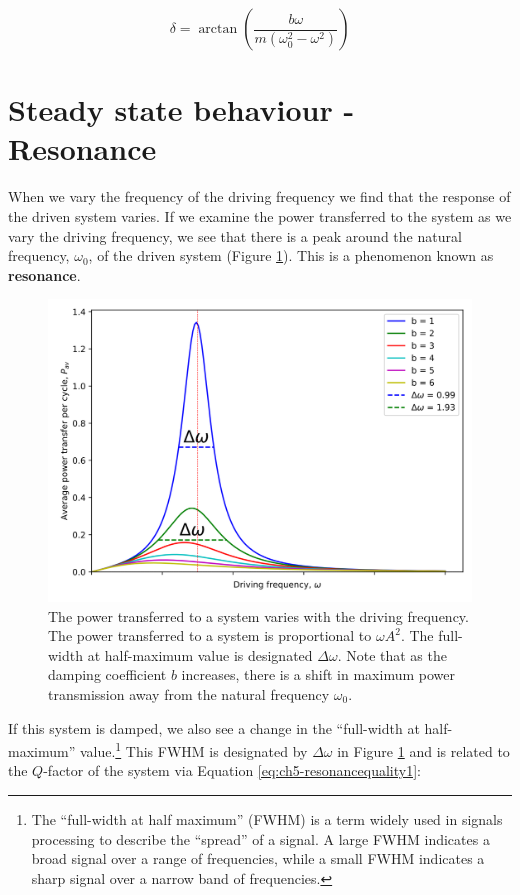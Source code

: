 \documentclass[
]{book}
\begin{document}
\begin{equation}
\delta = \arctan \left( \frac{b\omega}{m \left(  \omega_0^2 - \omega^2 \right)} \right)
\label{eq:ch5-forcedshm5}
\end{equation}

\hypertarget{sec-ch5-steadystatebehaviour}{%
\section{Steady state behaviour - Resonance}\label{sec-ch5-steadystatebehaviour}}

When we vary the frequency of the driving frequency we find that the response of the driven system varies. If we examine the power transferred to the system as we vary the driving frequency, we see that there is a peak around the natural frequency, \(\omega_0\), of the driven system (Figure \ref{fig:ch5-resonancepowerfrequency1}). This is a phenomenon known as \textbf{resonance}.

\begin{figure}

{\centering \includegraphics[width=0.7\linewidth]{visualisations/ch5-forcedosc2} 

}

\caption{The power transferred to a system varies with the driving frequency. The power transferred to a system is proportional to $\omega A^2$. The full-width at half-maximum value is designated $\Delta \omega$. Note that as the damping coefficient $b$ increases, there is a shift in maximum power transmission away from the natural frequency $\omega_0$.}\label{fig:ch5-resonancepowerfrequency1}
\end{figure}

If this system is damped, we also see a change in the ``full-width at half-maximum'' value.\footnote{The ``full-width at half maximum'' (FWHM) is a term widely used in signals processing to describe the ``spread'' of a signal. A large FWHM indicates a broad signal over a range of frequencies, while a small FWHM indicates a sharp signal over a narrow band of frequencies.} This FWHM is designated by \(\Delta \omega\) in Figure \ref{fig:ch5-resonancepowerfrequency1} and is related to the \(Q\)-factor of the system via Equation \eqref{eq:ch5-resonancequality1}:
\end{document}
